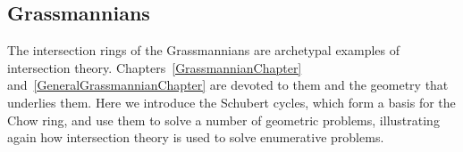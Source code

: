 


\subsection{Grassmannians}

The intersection rings of the Grassmannians are archetypal examples of intersection theory.  Chapters~\ref{GrassmannianChapter} and~\ref{GeneralGrassmannianChapter} are
devoted to them and the geometry that underlies them. Here we introduce the Schubert cycles, which form a basis for the Chow ring, and use them to solve a number of geometric problems, illustrating again how intersection theory is used to solve enumerative problems.



%
%
%
%
%


